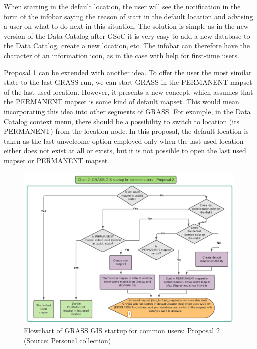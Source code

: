 \documentclass[a4paper,10pt,twoside]{article}
\begin{document}
When starting in the default location, the user will see the
notification in the form of the infobar saying the reason of start in
the default location and advising a user on what to do next in this
situation. The solution is simple as in the new version of the Data
Catalog after GSoC it is very easy to add a new database to the Data
Catalog, create a new location, etc. The infobar can therefore have
the character of an information icon, as in the case with help for
first-time users.

\newpage
\noindent Proposal 1 can be extended with another idea. To offer the user the
most similar state to the last GRASS run, we can start GRASS in the
PERMANENT mapset of the last used location. However, it presents a new
concept, which assumes that the PERMANENT mapset is some kind of
default mapset. This would mean incorporating this idea into other
segments of GRASS. For example, in the Data Catalog context menu,
there should be a possibility to switch to location (its PERMANENT)
from the location node. In this proposal, the default location is
taken as the last unwelcome option employed only when the last used
location either does not exist at all or exists, but it is not
possible to open the last used mapset or PERMANENT mapset.
 
\vspace{0.3cm}
\begin{figure}[hbt!] 
\begin{center}
\includegraphics[width=17cm]{../pictures/normal_user_diagram2.png} 
\caption[Flowchart of GRASS GIS startup for common users: Proposal 2]{Flowchart of GRASS GIS startup for common users: Proposal 2 (Source: Personal collection)}
\label{fig:normal_user_diagram2}
\end{center}
\end{figure}
\end{document}

